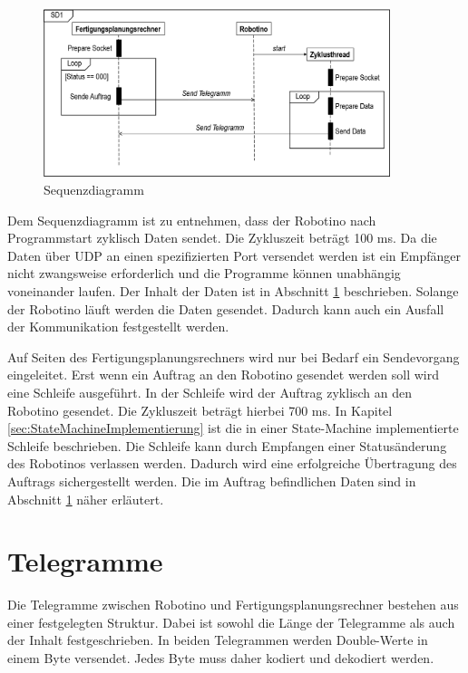 \begin{figure}[htb]
    \centering
    \includegraphics[width=0.9\textwidth]{Abbildungen/Sequenzdiagramm.PNG}
    \caption{Sequenzdiagramm}		
    \label{fig:Sequenzdiagramm}
\end{figure}

Dem Sequenzdiagramm ist zu entnehmen, dass der Robotino nach Programmstart zyklisch Daten sendet. Die Zykluszeit beträgt 100 ms. Da die Daten über UDP an einen spezifizierten Port versendet werden ist ein Empfänger nicht zwangsweise erforderlich und die Programme können unabhängig voneinander laufen. Der Inhalt der Daten ist in Abschnitt \ref{sec:Telegramme} beschrieben. Solange der Robotino läuft werden die Daten gesendet. Dadurch kann auch ein Ausfall der Kommunikation festgestellt werden. 

Auf Seiten des Fertigungsplanungsrechners wird nur bei Bedarf ein Sendevorgang eingeleitet. Erst wenn ein Auftrag an den Robotino gesendet werden soll wird eine Schleife ausgeführt. In der Schleife wird der Auftrag zyklisch an den Robotino gesendet. Die Zykluszeit beträgt hierbei 700 ms. In Kapitel \ref{sec:StateMachineImplementierung} ist die in einer State-Machine implementierte Schleife beschrieben. Die Schleife kann durch Empfangen einer Statusänderung des Robotinos verlassen werden. Dadurch wird eine erfolgreiche Übertragung des Auftrags sichergestellt werden. Die im Auftrag befindlichen Daten sind in Abschnitt \ref{sec:Telegramme} näher erläutert.

\section{Telegramme}
\label{sec:Telegramme}

Die Telegramme zwischen Robotino und Fertigungsplanungsrechner bestehen aus einer festgelegten Struktur. Dabei ist sowohl die Länge der Telegramme als auch der Inhalt festgeschrieben. In beiden Telegrammen werden Double-Werte in einem Byte versendet. Jedes Byte muss daher kodiert und dekodiert werden. 


